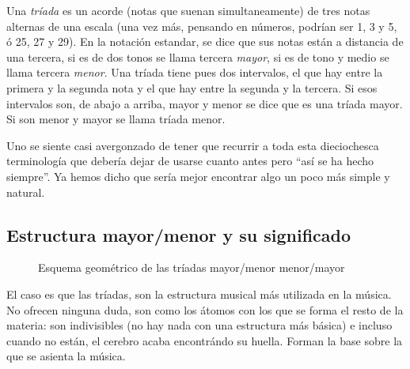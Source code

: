 \documentclass[]{report}
\begin{document}
Una \emph{tríada} es un acorde (notas que suenan simultaneamente) de tres notas alternas de una escala (una vez más, pensando en números, podrían ser 1, 3 y 5, ó 25, 27 y 29). En la notación estandar, se dice que sus notas están a distancia de una tercera, si es de dos tonos se llama tercera \emph{mayor}, si es de tono y medio se llama tercera \emph{menor}. Una tríada tiene pues dos intervalos, el que hay entre la primera y la segunda nota y el que hay entre la segunda y la tercera. Si esos intervalos son, de abajo a arriba, mayor y menor se dice que es una tríada mayor. Si son menor y mayor se llama tríada menor.

Uno se siente casi avergonzado de tener que recurrir a toda esta dieciochesca terminología que debería dejar de usarse cuanto antes pero ``así se ha hecho siempre''. Ya hemos dicho que sería mejor encontrar algo un poco más simple y natural.

\subsection{Estructura mayor/menor y su significado}

\begin{figure}[htbp]
  \center%
    \vspace{12pt}
  \caption{Esquema geométrico de las tríadas mayor/menor menor/mayor}\label{fig:maj-minor-scheme}
 \end{figure}
 
El caso es que las tríadas, son la estructura musical más utilizada en la música. No ofrecen ninguna duda, son como los átomos con los que se forma el resto de la materia: son indivisibles (no hay nada con una estructura más básica) e incluso cuando no están, el cerebro acaba encontrándo su huella. Forman la base sobre la que se asienta la música.
\end{document}
